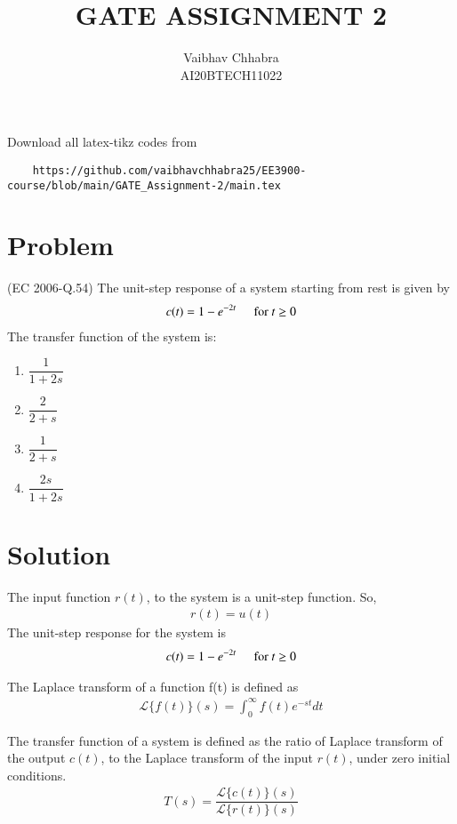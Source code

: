 \documentclass[journal,12pt,twocolumn]{IEEEtran}
\begin{document}
     \def\topbox#1{\raisebox{-\baselineskip}[0in][0in]{#1}}
     \def\midbox#1{\raisebox{-0.5\baselineskip}[0in][0in]{#1}}
\vspace{3cm}
\title{GATE ASSIGNMENT 2}
\author{Vaibhav Chhabra\\ AI20BTECH11022}
\maketitle
\newpage
\bigskip
\renewcommand{\thefigure}{\theenumi}
\renewcommand{\thetable}{\theenumi}
Download all latex-tikz codes from 
%
\begin{lstlisting}
    https://github.com/vaibhavchhabra25/EE3900-course/blob/main/GATE_Assignment-2/main.tex
\end{lstlisting}
%
\section{Problem}
(EC 2006-Q.54) The unit-step response of a system starting from rest is given by
\begin{align}
    c(t)=1-e^{-2t} \hspace{0.5cm} \text{for} \  t\geq0 
\end{align}
The transfer function of the system is:
\begin{enumerate}
    \item $\dfrac{1}{1+2s}$ \vspace{0.2cm}
    \item $\dfrac{2}{2+s}$ \vspace{0.2cm}
    \item $\dfrac{1}{2+s}$ \vspace{0.2cm}
    \item $\dfrac{2s}{1+2s}$
\end{enumerate}
\section{Solution}
The input function $r(t)$, to the system is a unit-step function. So, 
\begin{align}
    r(t)=u(t)
\end{align}
The unit-step response for the system is
\begin{align}
    c(t)=1-e^{-2t} \hspace{0.5cm} \text{for} \  t\geq0 
\end{align}
\begin{definition}
The Laplace transform of a function f(t) is defined as
\begin{align}
    \mathcal{L}\{f(t)\}(s)=\int_0^\infty f(t)e^{-st}dt
\end{align}
\end{definition}
\begin{definition}\label{def-2}
The transfer function of a system is defined as the ratio of Laplace transform of the output $c(t)$, to the Laplace transform of the input $r(t)$, under zero initial conditions.
\begin{align}
    T(s)=\dfrac{\mathcal{L}\{c(t)\}(s)}{\mathcal{L}\{r(t)\}(s)}
\end{align}
\end{definition}
\end{document}
